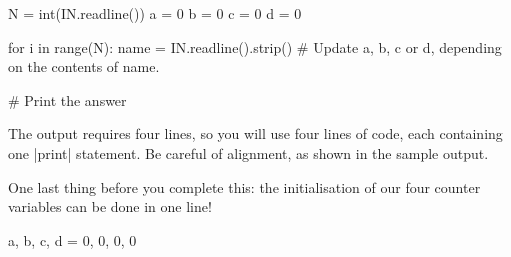 \begin{pythoncode}
  N = int(IN.readline())
  a = 0
  b = 0
  c = 0
  d = 0

  for i in range(N):
    name = IN.readline().strip()
    # Update a, b, c or d, depending on the contents of name.

  # Print the answer
\end{pythoncode}

The output requires four lines, so you will use four lines of code, each containing one
\pycode|print| statement. Be careful of alignment, as shown in the sample output.

One last thing before you complete this: the initialisation of our four counter variables
can be done in one line!

\begin{pythoncode}
  a, b, c, d = 0, 0, 0, 0
\end{pythoncode}

